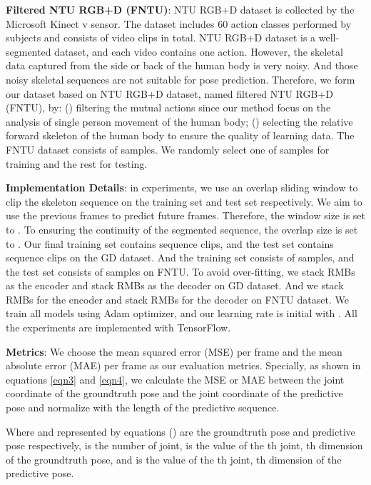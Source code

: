 \documentclass[journal]{IEEEtran}
\begin{document}
{\bf Filtered NTU RGB+D (FNTU)}: NTU RGB+D \cite{AmirNTU} dataset is collected by the Microsoft Kinect v sensor. The dataset includes 60 action classes performed by  subjects and consists of  video clips in total. NTU RGB+D dataset is a well-segmented dataset, and each video contains one action. However, the skeletal data captured from the side or back of the human body is very noisy. And those noisy skeletal sequences are not suitable for pose prediction. Therefore, we form our dataset based on NTU RGB+D dataset, named filtered NTU RGB+D (FNTU), by: () filtering the mutual actions since our method focus on the analysis of single person movement of the human body; () selecting the relative forward skeleton of the human body to ensure the quality of learning data. The FNTU dataset consists of  samples. We randomly select one of  samples for training and the rest for testing.

{\bf Implementation Details}: in experiments, we use an overlap sliding window to clip the skeleton sequence on the training set and test set respectively. We aim to use the previous  frames to predict future  frames. Therefore, the window size is set to . To ensuring the continuity of the segmented sequence, the overlap size is set to . Our final training set contains  sequence clips, and the test set contains  sequence clips on the GD dataset. And the training set consists of  samples, and the test set consists of  samples on FNTU. To avoid over-fitting, we stack  RMBs as the encoder and stack  RMBs as the decoder on GD dataset. And we stack  RMBs for the encoder and stack  RMBs for the decoder on FNTU dataset. We train all models using Adam optimizer, and our learning rate is initial with . All the experiments are implemented with TensorFlow.

{\bf Metrics}: We choose the mean squared error (MSE) per frame and the mean absolute error (MAE) per frame as our evaluation metrics. Specially, as shown in equations \ref{eqn3} and \ref{eqn4}, we calculate the MSE or MAE between the joint coordinate of the groundtruth pose and the joint coordinate of the predictive pose and normalize with the length of the predictive sequence.




Where  and   represented by equations () are the groundtruth pose and predictive pose respectively,  is the number of joint,  is the value of the th joint, th dimension of the groundtruth pose, and  is the value of the th joint, th dimension of the predictive pose.
\end{document}
